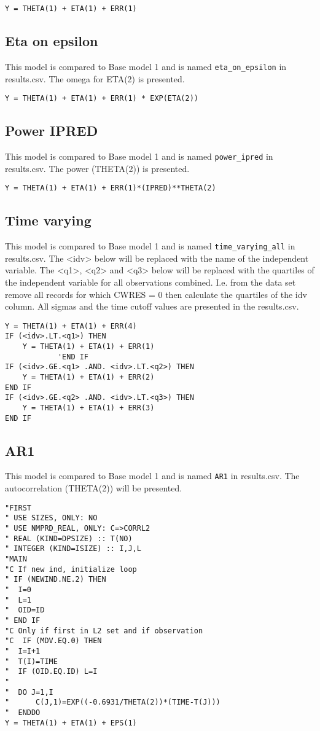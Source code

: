 \begin{verbatim}
Y = THETA(1) + ETA(1) + ERR(1)
\end{verbatim}

\subsection{Eta on epsilon}
This model is compared to Base model 1 and is named \verb|eta_on_epsilon| in results.csv. The omega for ETA(2) is presented.

\begin{verbatim}
Y = THETA(1) + ETA(1) + ERR(1) * EXP(ETA(2))
\end{verbatim}

\subsection{Power IPRED}
This model is compared to Base model 1 and is named \verb|power_ipred| in results.csv. The power (THETA(2)) is presented.

\begin{verbatim}
Y = THETA(1) + ETA(1) + ERR(1)*(IPRED)**THETA(2)
\end{verbatim}

\subsection{Time varying}
This model is compared to Base model 1 and is named \verb|time_varying_all| in results.csv. The <idv> below will be replaced with the name of the independent variable. The <q1>, <q2> and <q3> below will be replaced with the quartiles of the independent variable
for all observations combined. I.e. from the data set remove all records for which CWRES = 0 then calculate the quartiles of the idv column. All sigmas and the time cutoff values are presented in the results.csv.
\begin{verbatim}
Y = THETA(1) + ETA(1) + ERR(4)
IF (<idv>.LT.<q1>) THEN
    Y = THETA(1) + ETA(1) + ERR(1)
            'END IF
IF (<idv>.GE.<q1> .AND. <idv>.LT.<q2>) THEN
    Y = THETA(1) + ETA(1) + ERR(2)
END IF
IF (<idv>.GE.<q2> .AND. <idv>.LT.<q3>) THEN
    Y = THETA(1) + ETA(1) + ERR(3)
END IF
\end{verbatim}

\subsection{AR1}
This model is compared to Base model 1 and is named \verb|AR1| in results.csv. The autocorrelation (THETA(2)) will be presented.
\begin{verbatim}
"FIRST
" USE SIZES, ONLY: NO
" USE NMPRD_REAL, ONLY: C=>CORRL2
" REAL (KIND=DPSIZE) :: T(NO)
" INTEGER (KIND=ISIZE) :: I,J,L
"MAIN
"C If new ind, initialize loop
" IF (NEWIND.NE.2) THEN
"  I=0
"  L=1
"  OID=ID
" END IF
"C Only if first in L2 set and if observation
"C  IF (MDV.EQ.0) THEN
"  I=I+1
"  T(I)=TIME
"  IF (OID.EQ.ID) L=I
"
"  DO J=1,I
"      C(J,1)=EXP((-0.6931/THETA(2))*(TIME-T(J)))
"  ENDDO
Y = THETA(1) + ETA(1) + EPS(1)
\end{verbatim}

